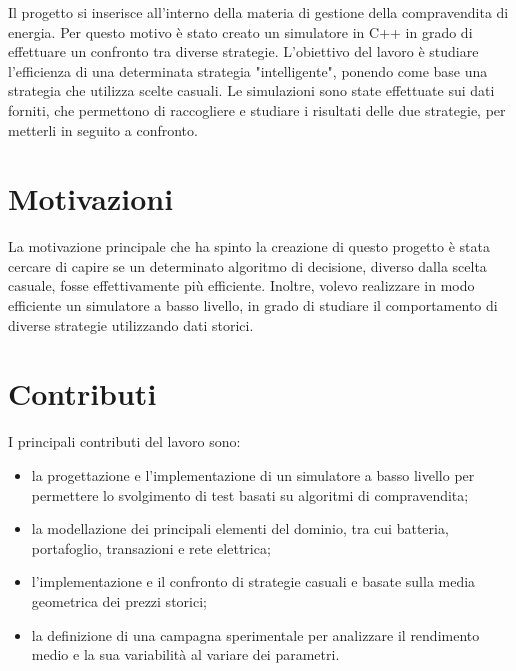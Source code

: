 \documentclass[12pt,a4paper,oneside]{report}
\begin{document}
Il progetto si inserisce all'interno della materia di gestione
della compravendita di energia.
Per questo motivo è stato creato un simulatore in C++ in grado
di effettuare un confronto tra diverse strategie.
L'obiettivo del lavoro è studiare l'efficienza di una determinata
strategia "intelligente", ponendo come base una strategia che utilizza
scelte casuali. Le simulazioni sono state effettuate sui dati forniti,
che permettono di raccogliere e studiare i risultati delle due strategie,
per metterli in seguito a confronto.



\section{Motivazioni}

La motivazione principale che ha spinto la creazione di questo progetto 
è stata cercare di capire se un determinato algoritmo di decisione, diverso
dalla scelta casuale, fosse effettivamente più efficiente.
Inoltre, volevo realizzare in modo efficiente un simulatore a basso livello,
in grado di studiare il comportamento di diverse strategie utilizzando dati storici.

\clearpage
\section{Contributi}

I principali contributi del lavoro sono:

\begin{itemize}

    \item la progettazione e l'implementazione di un simulatore a basso livello
          per permettere lo svolgimento di test basati su algoritmi di compravendita;

    \item la modellazione dei principali elementi del dominio, tra cui
          batteria, portafoglio, transazioni e rete elettrica;

    \item l'implementazione e il confronto di strategie casuali e basate sulla
          media geometrica dei prezzi storici;

    \item la definizione di una campagna sperimentale per analizzare il
          rendimento medio e la sua variabilità al variare dei parametri.

\end{itemize}
\end{document}

